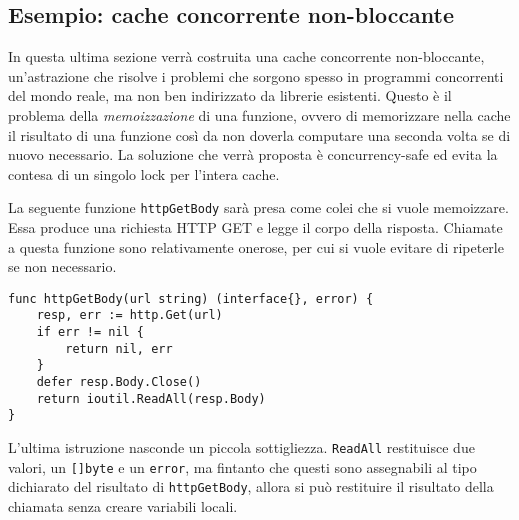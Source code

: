 \documentclass[../../thesis.tex]{subfiles}
\begin{document}
    \subsection{Esempio: cache concorrente non-bloccante}\label{subsec:esempio:-cache-concorrente-non-bloccante}
    In questa ultima sezione verrà costruita una cache concorrente non-bloccante, un'astrazione che risolve i problemi che sorgono spesso in programmi concorrenti del mondo reale, ma non ben indirizzato da librerie esistenti.
    Questo è il problema della \textit{memoizzazione} di una funzione, ovvero di memorizzare nella cache il risultato di una funzione così da non doverla computare una seconda volta se di nuovo necessario.
    La soluzione che verrà proposta è concurrency-safe ed evita la contesa di un singolo lock per l'intera cache.
    \hfill \vspace{12pt}

    La seguente funzione \verb"httpGetBody" sarà presa come colei che si vuole memoizzare.
    Essa produce una richiesta HTTP GET e legge il corpo della risposta.
    Chiamate a questa funzione sono relativamente onerose, per cui si vuole evitare di ripeterle se non necessario.
    \begin{lstlisting}[frame = single,label={lst:lstlisting9-7.1}]
func httpGetBody(url string) (interface{}, error) {
    resp, err := http.Get(url)
    if err != nil {
        return nil, err
    }
    defer resp.Body.Close()
    return ioutil.ReadAll(resp.Body)
}
    \end{lstlisting}
    L'ultima istruzione nasconde un piccola sottigliezza. \verb"ReadAll" restituisce due valori, un \verb"[]byte" e un \verb"error", ma fintanto che questi sono assegnabili al tipo dichiarato del risultato di \verb"httpGetBody", allora si può restituire il risultato della chiamata senza creare variabili locali.
    \hfill \vspace{12pt}
\end{document}
